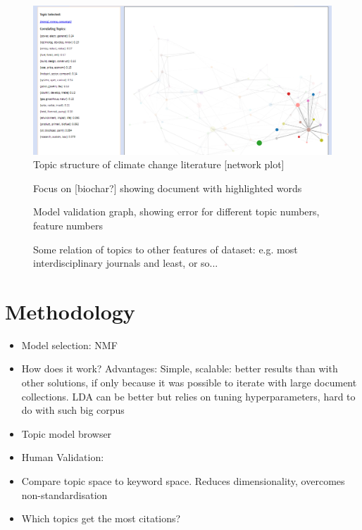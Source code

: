 \documentclass{article}
\begin{document}
\begin{figure}
	\includegraphics[width=\linewidth]{plots/snip}
    \caption{Topic structure of climate change literature [network plot]}
    \label{network}
\end{figure}


\begin{figure}
    \caption{Focus on [biochar?] showing document with highlighted words}
\end{figure}

\begin{figure}
    \caption{Model validation graph, showing error for different topic numbers, feature numbers}
\end{figure}


\begin{figure}
    \caption{Some relation of topics to other features of dataset: e.g. most interdisciplinary journals and least, or so...}
\end{figure}


\section*{Methodology}

\begin{itemize}
\item Model selection: NMF \citep{Lee1999}
\item How does it work? Advantages: Simple, scalable: better results than with other solutions, if only because it was possible to iterate with large document collections. LDA can be better but relies on tuning hyperparameters, hard to do with such big corpus
\item Topic model browser \citet{Chaney2012}
\item Human Validation: 
\item Compare topic space to keyword space. Reduces dimensionality, overcomes non-standardisation
\item Which topics get the most citations?

\end{itemize}
\end{document}
